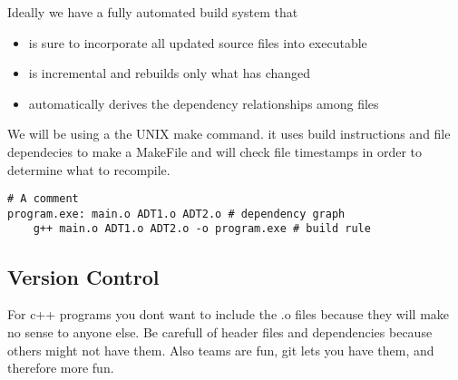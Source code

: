 \documentclass[12pt]{article}
\begin{document}
Ideally we have a fully automated build system that
\begin{itemize}
	\item is sure to incorporate all updated source files into executable
	\item is incremental and rebuilds only what has changed
	\item automatically derives the dependency relationships among files
\end{itemize}

We will be using a the UNIX make command. it uses build instructions and file dependecies to make a MakeFile and will check file timestamps in order to determine what to recompile.
\begin{verbatim}
# A comment
program.exe: main.o ADT1.o ADT2.o # dependency graph
    g++ main.o ADT1.o ADT2.o -o program.exe # build rule
\end{verbatim}

\subsection{Version Control}
For c++ programs you dont want to include the .o files because they will make no sense to anyone else. Be carefull of header files and dependencies because others might not have them. Also teams are fun, git lets you have them, and therefore more fun.
\end{document}
